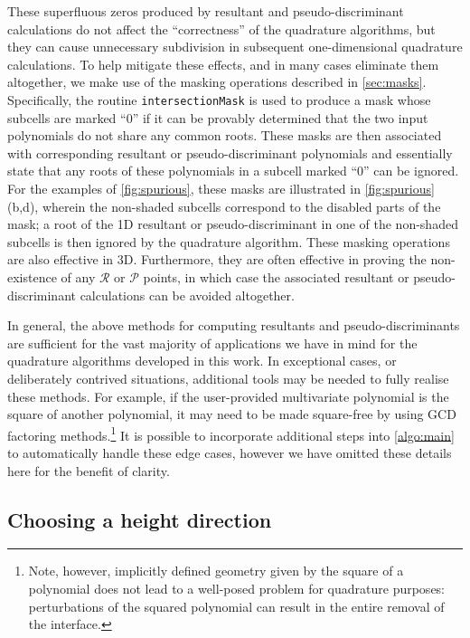 \documentclass[onefignum,onetabnum,onealgnum,oneeqnum]{siamart190516}
\begin{document}
These superfluous zeros produced by resultant and pseudo-discriminant calculations do not affect the ``correctness'' of the quadrature algorithms, but they can cause unnecessary subdivision in subsequent one-dimensional quadrature calculations. To help mitigate these effects, and in many cases eliminate them altogether, we make use of the masking operations described in \cref{sec:masks}. Specifically, the routine \texttt{intersectionMask} is used to produce a mask whose subcells are marked ``$0$'' if it can be provably determined that the two input polynomials do not share any common roots. These masks are then associated with corresponding resultant or pseudo-discriminant polynomials and essentially state that any roots of these polynomials in a subcell marked ``$0$'' can be ignored. For the examples of \cref{fig:spurious}, these masks are illustrated in \cref{fig:spurious}(b,d), wherein the non-shaded subcells correspond to the disabled parts of the mask; a root of the 1D resultant or pseudo-discriminant in one of the non-shaded subcells is then ignored by the quadrature algorithm. These masking operations are also effective in 3D. Furthermore, they are often effective in proving the non-existence of any $\mathcal R$ or $\mathcal P$ points, in which case the associated resultant or pseudo-discriminant calculations can be avoided altogether.

%

In general, the above methods for computing resultants and pseudo-discriminants are sufficient for the vast majority of applications we have in mind for the quadrature algorithms developed in this work. In exceptional cases, or deliberately contrived situations, additional tools may be needed to fully realise these methods. For example, if the user-provided multivariate polynomial is the square of another polynomial, it may need to be made square-free by using GCD factoring methods.\footnote{Note, however, implicitly defined geometry given by the square of a polynomial does not lead to a well-posed problem for quadrature purposes: perturbations of the squared polynomial can result in the entire removal of the interface.} It is possible to incorporate additional steps into \cref{algo:main} to automatically handle these edge cases, however we have omitted these details here for the benefit of clarity. 
%




\subsection{Choosing a height direction}
\label{sec:height}
\end{document}
